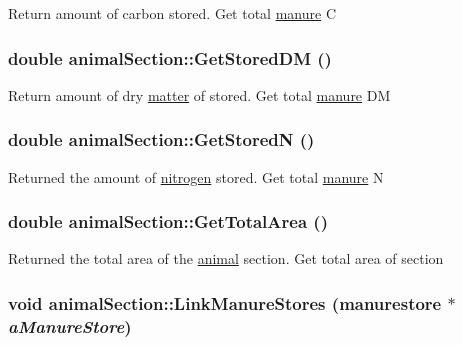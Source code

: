 Return amount of carbon stored. Get total \hyperlink{classmanure}{manure} C \hypertarget{classanimal_section_a789377838a3e4c5e1eb8739f15014a3f}{
\subsubsection[{GetStoredDM}]{\setlength{\rightskip}{0pt plus 5cm}double animalSection::GetStoredDM ()}}
\label{classanimal_section_a789377838a3e4c5e1eb8739f15014a3f}


Return amount of dry \hyperlink{classmatter}{matter} of stored. Get total \hyperlink{classmanure}{manure} DM \hypertarget{classanimal_section_ab67599c405210473dd2db71f28982318}{
\subsubsection[{GetStoredN}]{\setlength{\rightskip}{0pt plus 5cm}double animalSection::GetStoredN ()}}
\label{classanimal_section_ab67599c405210473dd2db71f28982318}


Returned the amount of \hyperlink{classnitrogen}{nitrogen} stored. Get total \hyperlink{classmanure}{manure} N \hypertarget{classanimal_section_a38e74942f2a9a7d767da7d8f209dc7ca}{
\subsubsection[{GetTotalArea}]{\setlength{\rightskip}{0pt plus 5cm}double animalSection::GetTotalArea ()}}
\label{classanimal_section_a38e74942f2a9a7d767da7d8f209dc7ca}


Returned the total area of the \hyperlink{classanimal}{animal} section. Get total area of section \hypertarget{classanimal_section_afc851db54dc233202416093ecc3049a5}{
\subsubsection[{LinkManureStores}]{\setlength{\rightskip}{0pt plus 5cm}void animalSection::LinkManureStores ({\bf manurestore} $\ast$ {\em aManureStore})}}
\label{classanimal_section_afc851db54dc233202416093ecc3049a5}


